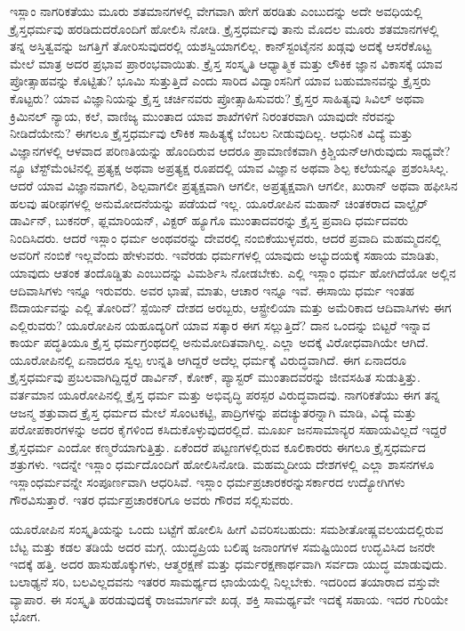 ಇಸ್ಲಾಂ ನಾಗರಿಕತೆಯು ಮೂರು ಶತಮಾನಗಳಲ್ಲಿ ವೇಗವಾಗಿ ಹೇಗೆ ಹರಡಿತು ಎಂಬುದನ್ನು ಅದೇ ಅವಧಿಯಲ್ಲಿ ಕ್ರೈಸ್ತಧರ್ಮವು ಹರಡಿದುದರೊಂದಿಗೆ ಹೋಲಿಸಿ ನೋಡಿ. ಕ್ರೈಸ್ತಧರ್ಮವು ತಾನು ಮೊದಲ ಮೂರು ಶತಮಾನಗಳಲ್ಲಿ ತನ್ನ ಅಸ್ತಿತ್ವವನ್ನು ಜಗತ್ತಿಗೆ ತೋರಿಸುವುದರಲ್ಲಿ ಯಶಸ್ವಿಯಾಗಲಿಲ್ಲ. ಕಾನ್​ಸ್ಟಂಟೈನನ ಖಡ್ಗವು ಅದಕ್ಕೆ ಆಸರೆಕೊಟ್ಟ ಮೇಲೆ ಮಾತ್ರ ಅದರ ಪ್ರಭಾವ ಪ್ರಾರಂಭವಾಯಿತು. ಕ್ರೈಸ್ತ ಸಂಸ್ಕೃತಿ ಆಧ್ಯಾತ್ಮಿಕ ಮತ್ತು ಲೌಕಿಕ ಜ್ಞಾನ ವಿಕಾಸಕ್ಕೆ ಯಾವ ಪ್ರೋತ್ಸಾಹವನ್ನು ಕೊಟ್ಟಿತು? ಭೂಮಿ ಸುತ್ತುತ್ತಿದೆ ಎಂದು ಸಾರಿದ ವಿದ್ವಾಂಸನಿಗೆ ಯಾವ ಬಹುಮಾನವನ್ನು ಕ್ರೈಸ್ತರು ಕೊಟ್ಟರು? ಯಾವ ವಿಜ್ಞಾನಿಯನ್ನು ಕ್ರೈಸ್ತ ಚರ್ಚಿನವರು ಪ್ರೋತ್ಸಾಹಿಸುವರು? ಕ್ರೈಸ್ತರ ಸಾಹಿತ್ಯವು ಸಿವಿಲ್​ ಅಥವಾ ಕ್ರಿಮಿನಲ್​ ನ್ಯಾಯ, ಕಲೆ, ವಾಣಿಜ್ಯ ಮುಂತಾದ ಯಾವ ಶಾಖೆಗಳಿಗೆ ನಿರಂತರವಾಗಿ ಯಾವುದೇ ನೆರವನ್ನು ನೀಡಿದೆಯೇನು? ಈಗಲೂ ಕ್ರೈಸ್ತಧರ್ಮವು ಲೌಕಿಕ ಸಾಹಿತ್ಯಕ್ಕೆ ಬೆಂಬಲ ನೀಡುವುದಿಲ್ಲ. ಆಧುನಿಕ ವಿದ್ಯೆ ಮತ್ತು ವಿಜ್ಞಾನಗಳಲ್ಲಿ ಆಳವಾದ ಪರಿಣತಿಯನ್ನು ಹೊಂದಿರುವ ಆದರೂ ಪ್ರಾಮಾಣಿಕವಾಗಿ ಕ್ರಿಶ್ಚಿಯನ್​ ಆಗಿರುವುದು ಸಾಧ್ಯವೇ? ನ್ಯೂ ಟೆಸ್ಟ್​ಮೆಂಟಿನಲ್ಲಿ ಪ್ರತ್ಯಕ್ಷ ಅಥವಾ ಅಪ್ರತ್ಯಕ್ಷ ರೂಪದಲ್ಲಿ ಯಾವ ವಿಜ್ಞಾನ ಅಥವಾ ಶಿಲ್ಪ ಕಲೆಯನ್ನೂ ಪ್ರಶಂಸಿಸಿಲ್ಲ. ಆದರೆ ಯಾವ ವಿಜ್ಞಾನವಾಗಲಿ, ಶಿಲ್ಪವಾಗಲೀ ಪ್ರತ್ಯಕ್ಷವಾಗಿ ಆಗಲೀ, ಅಪ್ರತ್ಯಕ್ಷವಾಗಿ ಆಗಲೀ, ಖುರಾನ್​ ಅಥವಾ ಹಫೀಸಿನ ಹಲವು ಷರೀಫಗಳಲ್ಲಿ ಅನು\break ಮೋದನೆಯನ್ನು ಪಡೆಯದೆ ಇಲ್ಲ. ಯೂರೋಪಿನ ಮಹಾನ್​ ಚಿಂತಕರಾದ ವಾಲ್ಟೈರ್​ ಡಾರ್ವಿನ್​, ಬುಕನರ್​, ಫ್ಲಮಾರಿಯನ್​, ವಿಕ್ಟರ್​ ಹ್ಯೂಗೊ ಮುಂತಾದವರನ್ನು ಕ್ರೈಸ್ತ ಪ್ರವಾದಿ ಧರ್ಮದವರು ನಿಂದಿಸಿದರು. ಆದರೆ ಇಸ್ಲಾಂ ಧರ್ಮ ಅಂಥವರನ್ನು ದೇವರಲ್ಲಿ ನಂಬಿಕೆಯುಳ್ಳವರು, ಆದರೆ ಪ್ರವಾದಿ ಮಹಮ್ಮದನಲ್ಲಿ ಅವರಿಗೆ ನಂಬಿಕೆ ಇಲ್ಲವೆಂದು ಹೇಳುವರು. ಇವೆರಡು ಧರ್ಮಗಳಲ್ಲಿ ಯಾವುದು ಅಭ್ಯುದಯಕ್ಕೆ ಸಹಾಯ ಮಾಡಿತು, ಯಾವುದು ಆತಂಕ ತಂದೊಡ್ಡಿತು ಎಂಬುದನ್ನು ವಿಮರ್ಶಿಸಿ ನೋಡಬೇಕು. ಎಲ್ಲಿ ಇಸ್ಲಾಂ ಧರ್ಮ ಹೋಗಿದೆಯೋ ಅಲ್ಲಿನ ಆದಿವಾಸಿಗಳು ಇನ್ನೂ ಇರುವರು. ಅವರ ಭಾಷೆ, ಮಾತು, ಆಚಾರ ಇನ್ನೂ ಇವೆ. ಈಸಾಯಿ ಧರ್ಮ ಇಂತಹ ಔದಾರ್ಯವನ್ನು ಎಲ್ಲಿ ತೋರಿದೆ? ಸ್ಪೆಯಿನ್​ ದೇಶದ ಅರಬ್ಬರು, ಆಸ್ಟ್ರೇಲಿಯಾ ಮತ್ತು ಅಮೆರಿಕಾದ ಆದಿವಾಸಿಗಳು ಈಗ ಎಲ್ಲಿರುವರು? ಯೂರೋಪಿನ ಯಹೂದ್ಯರಿಗೆ ಯಾವ ಸತ್ಕಾರ ಈಗ ಸಲ್ಲುತ್ತಿದೆ? ದಾನ ಒಂದನ್ನು ಬಿಟ್ಟರೆ ಇನ್ನಾವ ಕಾರ್ಯ ಪದ್ಧತಿಯೂ ಕ್ರೈಸ್ತ ಧರ್ಮಗ್ರಂಥದಲ್ಲಿ ಅನುಮೋದಿತವಾಗಿಲ್ಲ. ಎಲ್ಲಾ ಅದಕ್ಕೆ ವಿರೋಧವಾಗಿಯೇ ಆಗಿದೆ. ಯೂರೋಪಿನಲ್ಲಿ ಏನಾದರೂ ಸ್ವಲ್ಪ ಉನ್ನತಿ ಆಗಿದ್ದರೆ ಅದೆಲ್ಲ ಧರ್ಮಕ್ಕೆ ವಿರುದ್ಧವಾಗಿದೆ. ಈಗ ಏನಾದರೂ ಕ್ರೈಸ್ತಧರ್ಮವು ಪ್ರಬಲವಾಗಿದ್ದಿದ್ದರೆ ಡಾರ್ವಿನ್​, ಕೋಕ್​, ಪ್ಯಾಸ್ಟರ್​ ಮುಂತಾದವರನ್ನು ಜೀವಸಹಿತ ಸುಡುತ್ತಿತ್ತು. ವರ್ತಮಾನ ಯೂರೋಪಿನಲ್ಲಿ ಕ್ರೈಸ್ತ ಧರ್ಮ ಮತ್ತು ಅಭಿವೃದ್ಧಿ ಪರಸ್ಪರ ವಿರುದ್ಧವಾದವು. ನಾಗರಿಕತೆಯು ಈಗ ತನ್ನ ಆಜನ್ಮ ಶತ್ರುವಾದ ಕ್ರೈಸ್ತ ಧರ್ಮದ ಮೇಲೆ ಸೊಂಟಕಟ್ಟಿ, ಪಾದ್ರಿಗಳನ್ನು ಪದಚ್ಯುತರನ್ನಾಗಿ ಮಾಡಿ, ವಿದ್ಯೆ ಮತ್ತು ಪರೋಪಕಾರಗಳನ್ನು ಅದರ ಕೈಗಳಿಂದ ಕಸಿದುಕೊಳ್ಳುವುದರಲ್ಲಿದೆ. ಮೂರ್ಖ ಜನ\break ಸಾಮಾನ್ಯರ ಸಹಾಯವಿಲ್ಲದೆ ಇದ್ದರೆ ಕ್ರೈಸ್ತಧರ್ಮ ಎಂದೋ ಕಣ್ಮರೆಯಾಗುತ್ತಿತ್ತು. ಏಕೆಂದರೆ ಪಟ್ಟಣಗಳಲ್ಲಿರುವ ಕೂಲಿಕಾರರು ಈಗಲೂ ಕ್ರೈಸ್ತಧರ್ಮದ ಶತ್ರುಗಳು. ಇದನ್ನೇ ಇಸ್ಲಾಂ ಧರ್ಮದೊಂದಿಗೆ ಹೋಲಿಸಿನೋಡಿ. ಮಹಮ್ಮದೀಯ ದೇಶಗಳಲ್ಲಿ ಎಲ್ಲಾ ಶಾಸನಗಳೂ ಇಸ್ಲಾಂಧರ್ಮವನ್ನೇ ಸಂಪೂರ್ಣವಾಗಿ ಆಧರಿಸಿವೆ. ಇಸ್ಲಾಂ ಧರ್ಮಪ್ರಚಾರಕರನ್ನು\break ಸರ್ಕಾರದ ಉದ್ಯೋಗಿಗಳು ಗೌರವಿಸುತ್ತಾರೆ. ಇತರ ಧರ್ಮಪ್ರಚಾರಕರಿಗೂ ಅವರು ಗೌರವ ಸಲ್ಲಿಸುವರು.

ಯೂರೋಪಿನ ಸಂಸ್ಕೃತಿಯನ್ನು ಒಂದು ಬಟ್ಟೆಗೆ ಹೋಲಿಸಿ ಹೀಗೆ ವಿವರಿಸಬಹುದು: ಸಮಶೀತೋಷ್ಣವಲಯದಲ್ಲಿರುವ ಬೆಟ್ಟ ಮತ್ತು ಕಡಲ ತಡಿಯೆ ಅದರ ಮಗ್ಗ. ಯುದ್ಧಪ್ರಿಯ ಬಲಿಷ್ಠ ಜನಾಂಗಗಳ ಸಮಷ್ಟಿಯಿಂದ ಉದ್ಭವಿಸಿದ ಜನರೇ ಇದಕ್ಕೆ ಹತ್ತಿ. ಅದರ ಹಾಸುಹೊಕ್ಕು\break ಗಳು, ಆತ್ಮರಕ್ಷಣೆ ಮತ್ತು ಧರ್ಮರಕ್ಷಣಾರ್ಥವಾಗಿ ಸರ್ವದಾ ಯುದ್ಧ ಮಾಡುವುದು. ಬಲಾಢ್ಯನೆ ಸರಿ, ಬಲವಿಲ್ಲದವನು ಇತರರ ಸಾಮರ್ಥ್ಯದ ಛಾಯೆಯಲ್ಲಿ ನಿಲ್ಲಬೇಕು. ಇದರಿಂದ ತಯಾರಾದ ವಸ್ತುವೇ ವ್ಯಾಪಾರ. ಈ ಸಂಸ್ಕೃತಿ ಹರಡುವುದಕ್ಕೆ ರಾಜಮಾರ್ಗವೇ ಖಡ್ಗ. ಶಕ್ತಿ ಸಾಮರ್ಥ್ಯವೇ ಇದಕ್ಕೆ ಸಹಾಯ. ಇದರ ಗುರಿಯೇ ಭೋಗ.


